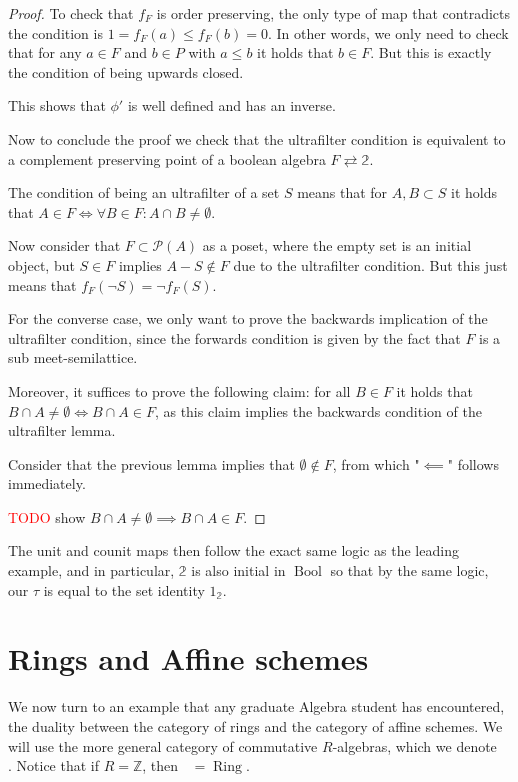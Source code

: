 \documentclass[12pt,a4paper]{article}
\DeclareMathOperator{\Bool}{Bool}
\DeclareMathOperator{\CAlg}{CAlg_R}
\DeclareMathOperator{\CAlgZ}{CAlg_\mathbb{Z}}
\DeclareMathOperator{\Ring}{Ring}
\begin{document}
\begin{proof}
To check that $f_F$ is order preserving, the only type of map that contradicts the condition is $ 1 =f_F(a) \leq f_F(b) = 0$. In other words, we only need to check that for any $a \in F$ and $b \in P$ with $a \leq b$ it holds that $b \in F$. But this is exactly the condition of being upwards closed. 

This shows that $\phi'$ is well defined and has an inverse. 

Now to conclude the proof we check that the ultrafilter condition is equivalent to a complement preserving point of a boolean algebra $F \rightleftarrows \mathbb{2}$.

The condition of being an ultrafilter of a set $S$ means that for $A, B \subset S$ it holds that $A \in F \iff \forall B \in F: A \cap B \neq \emptyset $.


 Now consider that $F \subset \mathcal{P}(A)$ as a poset, where the empty set is an initial object, but $S \in F$ implies $A - S \notin F$ due to the ultrafilter condition. But this just means that $f_F(\neg S) = \neg f_F(S)$. 
 
 For the converse case, we only want to prove the backwards implication of the ultrafilter condition, since the forwards condition is given by the fact that $F$ is a sub meet-semilattice. 
 
 
 Moreover, it suffices to prove the following claim: for all $B \in F$ it holds that  $B \cap A \neq \emptyset \iff B \cap A \in F$, as this claim  implies the backwards condition of the ultrafilter lemma.
 
 
 Consider that the previous lemma implies that $\emptyset \notin F$, from which "$\impliedby$" follows immediately.
 
\textcolor{red}{TODO} show $B \cap A \neq \emptyset \implies B \cap A \in F$. 
\end{proof}


The unit and counit maps then follow the exact same logic as the leading example, and in particular, $\mathbb{2}$ is also initial in $\Bool$ so that by the same logic, our $\tau$ is equal to the set identity $1_{\mathbb{2}}$. 



\section{Rings and Affine schemes}

We now turn to an example that any graduate Algebra student has encountered, the duality between the category of rings and the category of affine schemes. We will use the more general category of commutative $R$-algebras, which we denote $\CAlg$. Notice that if $R = \mathbb{Z}$, then $\CAlgZ = \Ring$. 
\end{document}
